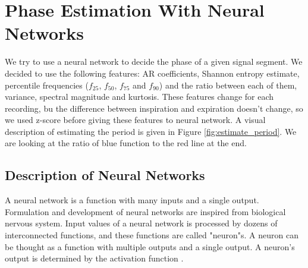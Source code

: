 \section{Phase Estimation With Neural Networks}
We try to use a neural network to decide the phase of a given signal segment. We decided to use the following features: AR coefficients, Shannon entropy estimate, percentile frequencies ($f_{25}$, $f_{50}$, $f_{75}$ and $f_{90}$) and the ratio between each of them, variance, spectral magnitude and kurtosis. These features change for each recording, bu the difference between inspiration and expiration doesn't change, so we used z-score before giving these features to neural network. A visual description of estimating the period is given in Figure \ref{fig:estimate_period}. We are looking at the ratio of blue function to the red line at the end.

\subsection{Description of Neural Networks} 
A neural network is a function with many inputs and a single output. Formulation and development of neural networks are inspired from biological nervous system. Input values of a neural network is processed by dozens of interconnected functions, and these functions are called "neuron"s. A neuron can be thought as a function with multiple outputs and a single output. A neuron's output is determined by the activation function \cite{neural-networks}.
